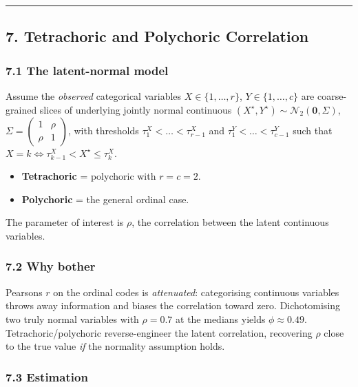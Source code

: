 \documentclass{article}
\providecommand{\tightlist}{\setlength{\itemsep}{0pt}\setlength{\parskip}{0pt}}
\begin{document}
\begin{center}\rule{0.5\linewidth}{0.5pt}\end{center}

\subsection{7. Tetrachoric and Polychoric
Correlation}\label{7-tetrachoric-and-polychoric-correlation}

\subsubsection{7.1 The latent-normal
model}\label{71-the-latent-normal-model}

Assume the \emph{observed} categorical variables
\(X \in \{1, \dots, r\}\), \(Y \in \{1, \dots, c\}\) are coarse-grained
slices of underlying jointly normal continuous
\((X^\star, Y^\star) \sim \mathcal{N}_2(\mathbf{0}, \Sigma)\),
\(\Sigma = \begin{pmatrix} 1 & \rho \\ \rho & 1 \end{pmatrix}\), with
thresholds \(\tau_1^X < \dots < \tau_{r-1}^X\) and
\(\tau_1^Y < \dots < \tau_{c-1}^Y\) such that
\(X = k \iff \tau_{k-1}^X < X^\star \leq \tau_k^X\).

\begin{itemize}
\tightlist
\item
  \textbf{Tetrachoric} = polychoric with \(r = c = 2\).
\item
  \textbf{Polychoric} = the general ordinal case.
\end{itemize}

The parameter of interest is \(\rho\), the correlation between the
latent continuous variables.

\subsubsection{7.2 Why bother}\label{72-why-bother}

Pearson\textquotesingle s \(r\) on the ordinal codes is
\emph{attenuated}: categorising continuous variables throws away
information and biases the correlation toward zero. Dichotomising two
truly normal variables with \(\rho = 0.7\) at the medians yields
\(\phi \approx 0.49\). Tetrachoric/polychoric reverse-engineer the
latent correlation, recovering \(\rho\) close to the true value
\emph{if} the normality assumption holds.

\subsubsection{7.3 Estimation}\label{73-estimation}
\end{document}
